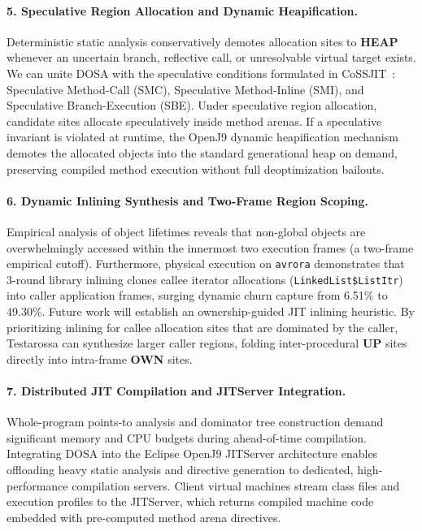 \documentclass[12pt,a4paper]{article}
\newcommand{\OWN}{\textbf{OWN}}
\newcommand{\UP}{\textbf{UP}}
\newcommand{\HEAP}{\textbf{HEAP}}
\begin{document}
\paragraph{5. Speculative Region Allocation and Dynamic Heapification.}
Deterministic static analysis conservatively demotes allocation sites to \HEAP{} whenever an uncertain branch, reflective call, or unresolvable virtual target exists. We can unite DOSA with the speculative conditions formulated in CoSSJIT~\cite{cossjit2025}: Speculative Method-Call (SMC), Speculative Method-Inline (SMI), and Speculative Branch-Execution (SBE). Under speculative region allocation, candidate sites allocate speculatively inside method arenas. If a speculative invariant is violated at runtime, the OpenJ9 dynamic heapification mechanism~\cite{anand2024heapify} demotes the allocated objects into the standard generational heap on demand, preserving compiled method execution without full deoptimization bailouts.

\paragraph{6. Dynamic Inlining Synthesis and Two-Frame Region Scoping.}
Empirical analysis of object lifetimes reveals that non-global objects are overwhelmingly accessed within the innermost two execution frames (a two-frame empirical cutoff). Furthermore, physical execution on \texttt{avrora} demonstrates that 3-round library inlining clones callee iterator allocations (\texttt{LinkedList\$ListItr}) into caller application frames, surging dynamic churn capture from 6.51\% to 49.30\%. Future work will establish an ownership-guided JIT inlining heuristic. By prioritizing inlining for callee allocation sites that are dominated by the caller, Testarossa can synthesize larger caller regions, folding inter-procedural \UP{} sites directly into intra-frame \OWN{} sites.

\paragraph{7. Distributed JIT Compilation and JITServer Integration.}
Whole-program points-to analysis and dominator tree construction demand significant memory and CPU budgets during ahead-of-time compilation. Integrating DOSA into the Eclipse OpenJ9 JITServer architecture enables offloading heavy static analysis and directive generation to dedicated, high-performance compilation servers. Client virtual machines stream class files and execution profiles to the JITServer, which returns compiled machine code embedded with pre-computed method arena directives.
\end{document}
